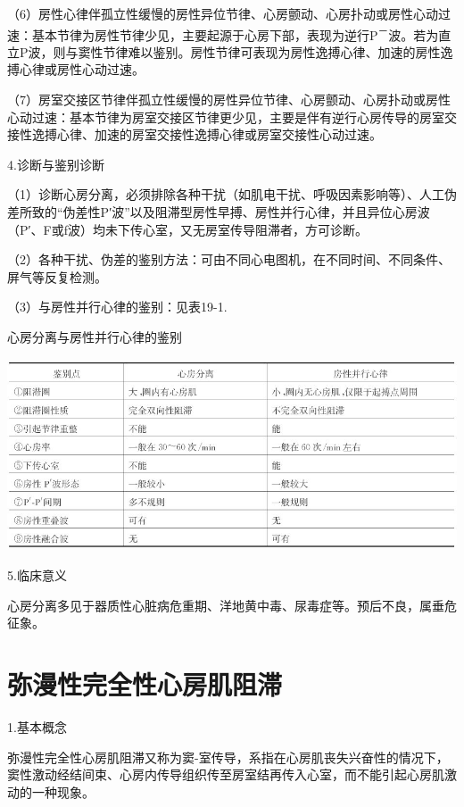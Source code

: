 （6）房性心律伴孤立性缓慢的房性异位节律、心房颤动、心房扑动或房性心动过速：基本节律为房性节律少见，主要起源于心房下部，表现为逆行P\textsuperscript{－}波。若为直立P波，则与窦性节律难以鉴别。房性节律可表现为房性逸搏心律、加速的房性逸搏心律或房性心动过速。

（7）房室交接区节律伴孤立性缓慢的房性异位节律、心房颤动、心房扑动或房性心动过速：基本节律为房室交接区节律更少见，主要是伴有逆行心房传导的房室交接性逸搏心律、加速的房室交接性逸搏心律或房室交接性心动过速。

4.诊断与鉴别诊断

（1）诊断心房分离，必须排除各种干扰（如肌电干扰、呼吸因素影响等）、人工伪差所致的“伪差性P′波”以及阻滞型房性早搏、房性并行心律，并且异位心房波（P′、F或f波）均未下传心室，又无房室传导阻滞者，方可诊断。

（2）各种干扰、伪差的鉴别方法：可由不同心电图机，在不同时间、不同条件、屏气等反复检测。

（3）与房性并行心律的鉴别：见表19-1.

\begin{table}[htbp]
\centering
\caption{心房分离与房性并行心律的鉴别}
\label{tab19-1}
\includegraphics[width=5.44792in,height=2.23958in]{./images/Image00329.jpg}
\end{table}

5.临床意义

心房分离多见于器质性心脏病危重期、洋地黄中毒、尿毒症等。预后不良，属垂危征象。

\protect\hypertarget{text00026.htmlux5cux23subid322}{}{}

\section{弥漫性完全性心房肌阻滞}

1.基本概念

弥漫性完全性心房肌阻滞又称为窦-室传导，系指在心房肌丧失兴奋性的情况下，窦性激动经结间束、心房内传导组织传至房室结再传入心室，而不能引起心房肌激动的一种现象。

